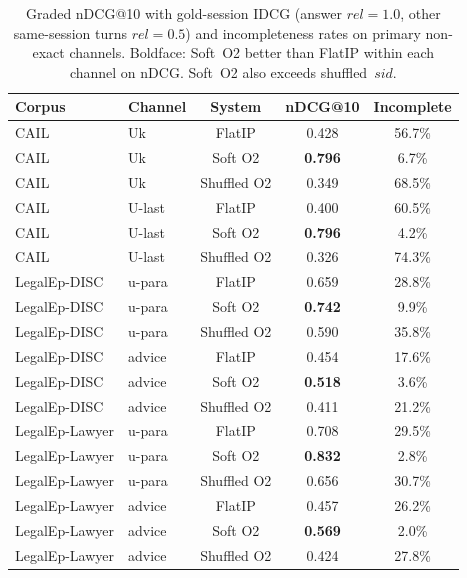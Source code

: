 \documentclass[preprint,12pt,authoryear]{elsarticle}
\newcommand{\compacttab}{\setlength{\tabcolsep}{4.5pt}\renewcommand{\arraystretch}{1.05}}
\begin{document}
\begin{table}[t]
\centering
\caption{Graded nDCG@10 with gold-session IDCG (answer $rel{=}1.0$, other same-session turns $rel{=}0.5$) and incompleteness rates on primary non-exact channels. Boldface: Soft~O2 better than FlatIP within each channel on nDCG. Soft~O2 also exceeds shuffled~$sid$.}
\label{tab:ndcg-graded}
\compacttab\footnotesize
\begin{tabular}{@{}llccc@{}}
\toprule
\textbf{Corpus} & \textbf{Channel} & \textbf{System} & \textbf{nDCG@10} & \textbf{Incomplete} \\
\midrule
CAIL & Uk & FlatIP & 0.428 & 56.7\% \\
CAIL & Uk & Soft O2 & \textbf{0.796} & 6.7\% \\
CAIL & Uk & Shuffled O2 & 0.349 & 68.5\% \\
CAIL & U-last & FlatIP & 0.400 & 60.5\% \\
CAIL & U-last & Soft O2 & \textbf{0.796} & 4.2\% \\
CAIL & U-last & Shuffled O2 & 0.326 & 74.3\% \\
LegalEp-DISC & u-para & FlatIP & 0.659 & 28.8\% \\
LegalEp-DISC & u-para & Soft O2 & \textbf{0.742} & 9.9\% \\
LegalEp-DISC & u-para & Shuffled O2 & 0.590 & 35.8\% \\
LegalEp-DISC & advice & FlatIP & 0.454 & 17.6\% \\
LegalEp-DISC & advice & Soft O2 & \textbf{0.518} & 3.6\% \\
LegalEp-DISC & advice & Shuffled O2 & 0.411 & 21.2\% \\
LegalEp-Lawyer & u-para & FlatIP & 0.708 & 29.5\% \\
LegalEp-Lawyer & u-para & Soft O2 & \textbf{0.832} & 2.8\% \\
LegalEp-Lawyer & u-para & Shuffled O2 & 0.656 & 30.7\% \\
LegalEp-Lawyer & advice & FlatIP & 0.457 & 26.2\% \\
LegalEp-Lawyer & advice & Soft O2 & \textbf{0.569} & 2.0\% \\
LegalEp-Lawyer & advice & Shuffled O2 & 0.424 & 27.8\% \\
\bottomrule
\end{tabular}
\end{table}
\end{document}
